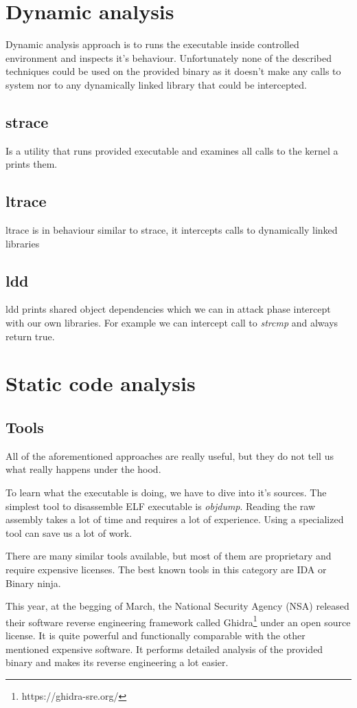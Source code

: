 \documentclass[conference]{IEEEtran}
\begin{document}
\section{Dynamic analysis}
Dynamic analysis approach is to runs the executable inside controlled environment and inspects it's behaviour.
Unfortunately none of the described techniques could be used on the provided binary as it doesn't make any calls to system nor to any dynamically linked library that could be intercepted.

\subsection{strace}
    Is a utility that runs provided executable and examines all calls to the kernel a prints them.
\subsection{ltrace}
    ltrace is in behaviour similar to strace, it intercepts calls to dynamically linked libraries
\subsection{ldd}
    ldd prints shared object dependencies which we can in attack phase intercept with our own libraries. For example we can intercept call to \textit{strcmp} and always return true.

\section{Static code analysis}  
\label{sec:static-analysis}
\subsection{Tools}
All of the aforementioned approaches are really useful, but they do not tell us what really happens under the hood. 

To learn what the executable is doing, we have to dive into it's sources.
The simplest tool to disassemble ELF executable is \textit{objdump}.
Reading the raw assembly takes a lot of time and requires a lot of experience. 
Using a specialized tool can save us a lot of work.

There are many similar tools available, but most of them are proprietary and require expensive licenses.
The best known tools in this category are IDA or Binary ninja.

This year, at the begging of March, the National Security Agency (NSA) released their software reverse engineering framework called Ghidra\footnote{https://ghidra-sre.org/} under an open source license. It is quite powerful and functionally comparable with the other mentioned expensive software. It performs detailed analysis of the provided binary and makes its reverse engineering a lot easier.
\end{document}
